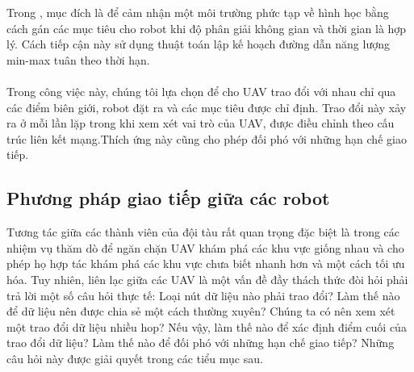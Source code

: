 \documentclass[11pt,openany]{book}
\begin{document}
Trong \cite{dai2018quality}, mục đích là để cảm nhận một môi trường phức tạp về hình học bằng cách gán các mục tiêu cho robot khi độ phân giải không gian và thời gian là hợp lý. Cách tiếp cận này sử dụng thuật toán lập kế hoạch đường dẫn năng lượng min-max tuân theo thời hạn.\\\\
Trong công việc này, chúng tôi lựa chọn để cho UAV trao đổi với nhau chỉ qua các điểm biên giới, robot đặt ra và các mục tiêu được chỉ định. Trao đổi này xảy ra ở mỗi lần lặp trong khi xem xét vai trò của UAV, được điều chỉnh theo cấu trúc liên kết mạng.Thích ứng này cũng cho phép đối phó với những hạn chế giao tiếp.
\subsection{Phương pháp giao tiếp giữa các robot}
Tương tác giữa các thành viên của đội tàu rất quan trọng đặc biệt là trong các nhiệm vụ thăm dò để ngăn chặn UAV khám phá các khu vực giống nhau và cho phép họ hợp tác khám phá các khu vực chưa biết nhanh hơn và một cách tối ưu hóa. Tuy nhiên, liên lạc giữa các UAV là một vấn đề đầy thách thức đòi hỏi phải trả lời một số câu hỏi thực tế: Loại nút dữ liệu nào phải trao đổi? Làm thế nào để dữ liệu nên được chia sẻ một cách thường xuyên? Chúng ta có nên xem xét một trao đổi dữ liệu nhiều hop? Nếu vậy, làm thế nào để xác định điểm cuối của trao đổi dữ liệu? Làm thế nào để đối phó với những hạn chế giao tiếp? Những câu hỏi này được giải quyết trong các tiểu mục sau.
\end{document}
